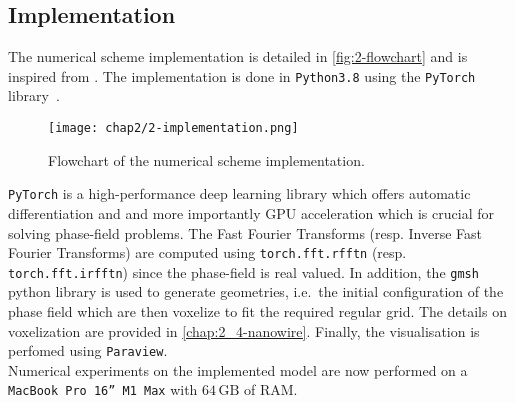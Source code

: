     \subsection{Implementation}
    The numerical scheme implementation is detailed in \autoref{fig:2-flowchart} and is inspired from \cite{Roy2021}. The implementation is done in \texttt{Python3.8} using the \texttt{PyTorch} library\ \cite{Ansel2024}.
    \begin{figure}[H]
        \centering
        \texttt{[image: chap2/2-implementation.png]}
        \caption{Flowchart of the numerical scheme implementation.}
        \label{fig:2-flowchart}
    \end{figure}
    \texttt{PyTorch} is a high-performance deep learning library which offers automatic differentiation and and more importantly GPU acceleration which is crucial for solving phase-field problems. The Fast Fourier Transforms (resp. Inverse Fast Fourier Transforms) are computed using \texttt{torch.fft.rfftn} (resp. \texttt{torch.fft.irfftn}) since the phase-field is real valued. In addition, the \texttt{gmsh} python library is used to generate geometries, i.e.\ the initial configuration of the phase field which are then voxelize to fit the required regular grid. The details on voxelization are provided in \autoref{chap:2_4-nanowire}. Finally, the visualisation is perfomed using \texttt{Paraview}.\\
    Numerical experiments on the implemented model are now performed on a \texttt{MacBook Pro 16'' M1 Max} with $64\,\text{GB}$ of RAM.
